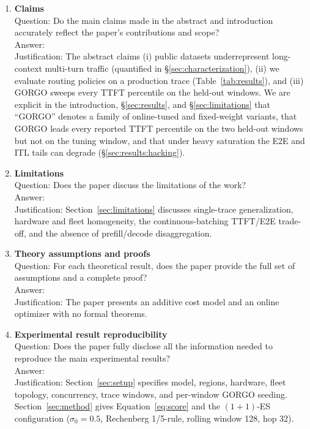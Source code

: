 \documentclass{article}
\begin{document}
\begin{enumerate}

\item {\bf Claims}\\
Question: Do the main claims made in the abstract and introduction accurately reflect the paper's contributions and scope?\\
Answer: \answerYes{}\\
Justification: The abstract claims (i) public datasets underrepresent long-context multi-turn traffic (quantified in \S\ref{sec:characterization}), (ii) we evaluate routing policies on a production trace (Table~\ref{tab:results}), and (iii) GORGO sweeps every TTFT percentile on the held-out windows. We are explicit in the introduction, \S\ref{sec:results}, and \S\ref{sec:limitations} that ``GORGO'' denotes a family of online-tuned and fixed-weight variants, that GORGO leads every reported TTFT percentile on the two held-out windows but not on the tuning window, and that under heavy saturation the E2E and ITL tails can degrade (\S\ref{sec:results:hacking}).

\item {\bf Limitations}\\
Question: Does the paper discuss the limitations of the work?\\
Answer: \answerYes{}\\
Justification: Section~\ref{sec:limitations} discusses single-trace generalization, hardware and fleet homogeneity, the continuous-batching TTFT/E2E trade-off, and the absence of prefill/decode disaggregation.

\item {\bf Theory assumptions and proofs}\\
Question: For each theoretical result, does the paper provide the full set of assumptions and a complete proof?\\
Answer: \answerNA{}\\
Justification: The paper presents an additive cost model and an online optimizer with no formal theorems.

\item {\bf Experimental result reproducibility}\\
Question: Does the paper fully disclose all the information needed to reproduce the main experimental results?\\
Answer: \answerYes{}\\
Justification: Section~\ref{sec:setup} specifies model, regions, hardware, fleet topology, concurrency, trace windows, and per-window GORGO seeding. Section~\ref{sec:method} gives Equation~\ref{eq:score} and the $(1{+}1)$-ES configuration ($\sigma_0=0.5$, Rechenberg 1/5-rule, rolling window 128, hop 32).


\end{enumerate}
\end{document}

